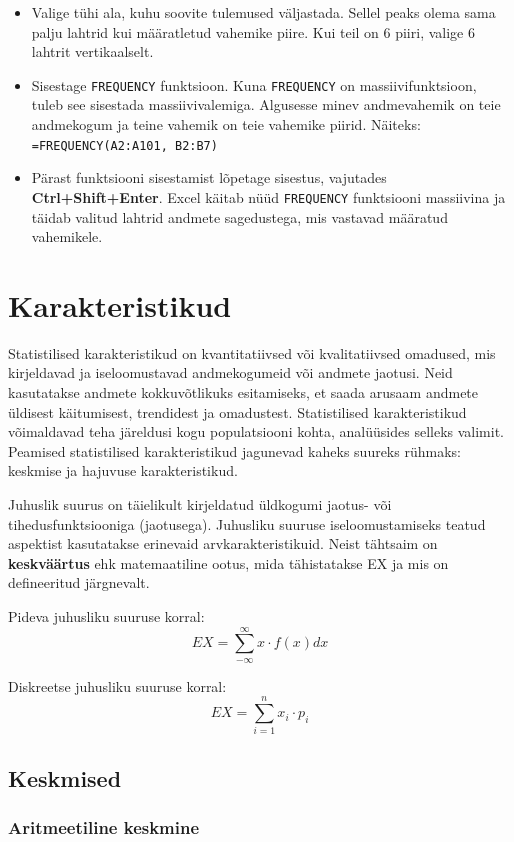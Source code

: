 \documentclass[
]{book}
\providecommand{\tightlist}{%
  \setlength{\itemsep}{0pt}\setlength{\parskip}{0pt}}
\begin{document}
\begin{itemize}
\tightlist
\item
  Valige tühi ala, kuhu soovite tulemused väljastada. Sellel peaks olema sama palju lahtrid kui määratletud vahemike piire. Kui teil on 6 piiri, valige 6 lahtrit vertikaalselt.
\item
  Sisestage \texttt{FREQUENCY} funktsioon. Kuna \texttt{FREQUENCY} on massiivifunktsioon, tuleb see sisestada massiivivalemiga. Algusesse minev andmevahemik on teie andmekogum ja teine vahemik on teie vahemike piirid.
  Näiteks: \texttt{=FREQUENCY(A2:A101,\ B2:B7)}
\item
  Pärast funktsiooni sisestamist lõpetage sisestus, vajutades \textbf{Ctrl+Shift+Enter}. Excel käitab nüüd \texttt{FREQUENCY} funktsiooni massiivina ja täidab valitud lahtrid andmete sagedustega, mis vastavad määratud vahemikele.
\end{itemize}

\chapter{Karakteristikud}\label{karakteristikud}

Statistilised karakteristikud on kvantitatiivsed või kvalitatiivsed omadused, mis kirjeldavad ja iseloomustavad andmekogumeid või andmete jaotusi. Neid kasutatakse andmete kokkuvõtlikuks esitamiseks, et saada arusaam andmete üldisest käitumisest, trendidest ja omadustest. Statistilised karakteristikud võimaldavad teha järeldusi kogu populatsiooni kohta, analüüsides selleks valimit. Peamised statistilised karakteristikud jagunevad kaheks suureks rühmaks: keskmise ja hajuvuse karakteristikud.

Juhuslik suurus on täielikult kirjeldatud üldkogumi jaotus- või tihedusfunktsiooniga (jaotusega). Juhusliku suuruse iseloomustamiseks teatud aspektist kasutatakse erinevaid arvkarakteristikuid. Neist tähtsaim on \textbf{keskväärtus} ehk matemaatiline ootus, mida tähistatakse EX ja mis on defineeritud järgnevalt.

Pideva juhusliku suuruse korral:
\[EX = \sum_{-\infty}^{\infty} x \cdot f(x) dx\]

Diskreetse juhusliku suuruse korral:
\[EX = \sum_{i=1}^{n} x_i \cdot p_i\]

\section{Keskmised}\label{keskmised}

\subsection{Aritmeetiline keskmine}\label{aritmeetiline-keskmine}
\end{document}
